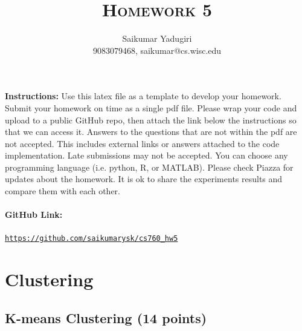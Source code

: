 \documentclass[a4paper]{article}
\title{\textsc{Homework 5}} %
\author{
Saikumar Yadugiri \\
9083079468, saikumar@cs.wisc.edu\\
}
\date{}
\theoremstyle{definition}
\begin{document}
\maketitle 


\textbf{Instructions:}
Use this latex file as a template to develop your homework. Submit your homework on time as a single pdf file. Please wrap your code and upload to a public GitHub repo, then attach the link below the instructions so that we can access it. Answers to the questions that are not within the pdf are not accepted. This includes external links or answers attached to the code implementation. Late submissions may not be accepted. You can choose any programming language (i.e. python, R, or MATLAB). Please check Piazza for updates about the homework. It is ok to share the experiments results and compare them with each other.

\vspace{0.1in}

\paragraph{GitHub Link:} \href{https://github.com/saikumarysk/cs760_hw5}{\texttt{https://github.com/saikumarysk/cs760\_hw5}}

\section{Clustering}

\subsection{K-means Clustering (14 points)}
\end{document}
